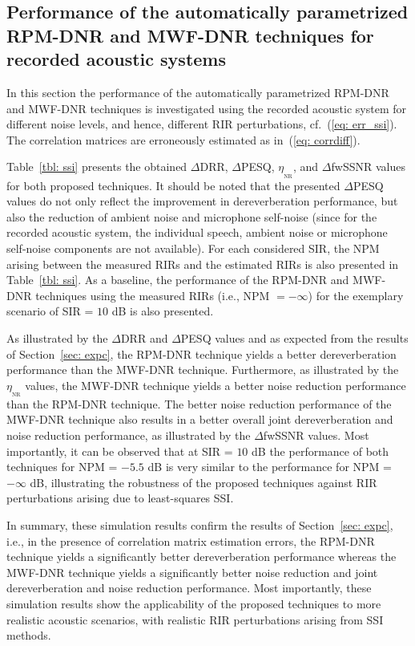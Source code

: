 \documentclass[10pt]{IEEEtran}
\begin{document}
{{
\subsection{Performance of the automatically parametrized RPM-DNR and MWF-DNR techniques for recorded acoustic systems}
\label{sec: expd}
In this section the performance of the automatically parametrized RPM-DNR and MWF-DNR techniques is investigated using the recorded acoustic system for different noise levels, and hence, different RIR perturbations, cf.~(\ref{eq: err_ssi}).
The correlation matrices are erroneously estimated as in~(\ref{eq: corrdiff}).

Table~\ref{tbl: ssi} presents the obtained $\Delta$DRR, $\Delta$PESQ, $\eta_{_{\text{NR}}}$, and $\Delta$fwSSNR values for both proposed techniques.
It should be noted that the presented $\Delta$PESQ values do not only reflect the improvement in dereverberation performance, but also the reduction of ambient noise and microphone self-noise (since for the recorded acoustic system, the individual speech, ambient noise or microphone self-noise components are not available).
For each considered SIR, the NPM arising between the measured RIRs and the estimated RIRs is also presented in Table~\ref{tbl: ssi}.
As a baseline, the performance of the RPM-DNR and MWF-DNR techniques using the measured RIRs (i.e., NPM $=-\infty$) for the exemplary scenario of SIR = $10$ dB is also presented.

As illustrated by the $\Delta$DRR and $\Delta$PESQ values and as expected from the results of Section~\ref{sec: expc}, the RPM-DNR technique yields a better dereverberation performance than the MWF-DNR technique.
Furthermore, as illustrated by the $\eta_{_{\text{NR}}}$ values, the MWF-DNR technique yields a better noise reduction performance than the RPM-DNR technique.
The better noise reduction performance of the MWF-DNR technique also results in a better overall joint dereverberation and noise reduction performance, as illustrated by the $\Delta$fwSSNR values.
Most importantly, it can be observed that at SIR = $10$ dB the performance of both techniques for NPM = $-5.5$ dB is very similar to the performance for NPM = $-\infty$ dB, illustrating the robustness of the proposed techniques against RIR perturbations arising due to least-squares SSI.

In summary, these simulation results confirm the results of Section~\ref{sec: expc}, i.e., in the presence of correlation matrix estimation errors, the RPM-DNR technique yields a significantly better dereverberation performance whereas the MWF-DNR technique yields a significantly better noise reduction and joint dereverberation and noise reduction performance.
Most importantly, these simulation results show the applicability of the proposed techniques to more realistic acoustic scenarios, with realistic RIR perturbations arising from SSI methods.
}}
\end{document}
